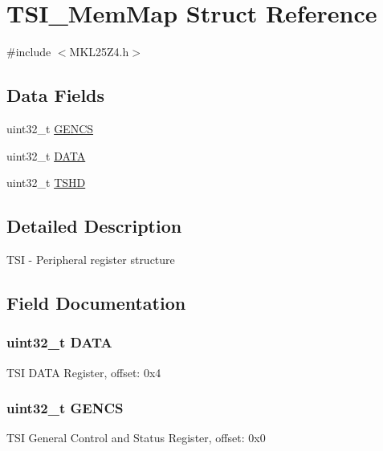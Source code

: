 \hypertarget{struct_t_s_i___mem_map}{}\section{T\+S\+I\+\_\+\+Mem\+Map Struct Reference}
\label{struct_t_s_i___mem_map}


{\ttfamily \#include $<$M\+K\+L25\+Z4.\+h$>$}

\subsection*{Data Fields}
\begin{DoxyCompactItemize}
\item 
uint32\+\_\+t \hyperlink{struct_t_s_i___mem_map_af2053cd193b25e18e6a76a1c0e7fcdd2}{G\+E\+N\+C\+S}
\item 
uint32\+\_\+t \hyperlink{struct_t_s_i___mem_map_aad20077939fb7b9e145416f55028ea37}{D\+A\+T\+A}
\item 
uint32\+\_\+t \hyperlink{struct_t_s_i___mem_map_a85a27c0645c0102ceea4ce506b84194e}{T\+S\+H\+D}
\end{DoxyCompactItemize}


\subsection{Detailed Description}
T\+S\+I -\/ Peripheral register structure 

\subsection{Field Documentation}
\hypertarget{struct_t_s_i___mem_map_aad20077939fb7b9e145416f55028ea37}{}
\subsubsection[{D\+A\+T\+A}]{\setlength{\rightskip}{0pt plus 5cm}uint32\+\_\+t D\+A\+T\+A}\label{struct_t_s_i___mem_map_aad20077939fb7b9e145416f55028ea37}
T\+S\+I D\+A\+T\+A Register, offset\+: 0x4 \hypertarget{struct_t_s_i___mem_map_af2053cd193b25e18e6a76a1c0e7fcdd2}{}
\subsubsection[{G\+E\+N\+C\+S}]{\setlength{\rightskip}{0pt plus 5cm}uint32\+\_\+t G\+E\+N\+C\+S}\label{struct_t_s_i___mem_map_af2053cd193b25e18e6a76a1c0e7fcdd2}
T\+S\+I General Control and Status Register, offset\+: 0x0 \hypertarget{struct_t_s_i___mem_map_a85a27c0645c0102ceea4ce506b84194e}{}
